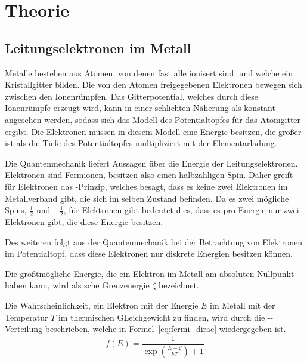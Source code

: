 
\section{Theorie}
%
\subsection{Leitungselektronen im Metall}
%
Metalle bestehen aus Atomen, von denen fast alle ionisert sind, und 
welche ein Kristallgitter bilden. Die von den Atomen freigegebenen 
Elektronen bewegen sich zwischen den Ionenrümpfen.
Das Gitterpotential, welches durch diese Ionenrümpfe erzeugt wird, kann
in einer schlichten Näherung als konstant angesehen werden, sodass sich
das Modell des Potentialtopfes für das Atomgitter ergibt. Die
Elektronen müssen in diesem Modell eine Energie besitzen, die größer ist als die
Tiefe des Potentialtopfes multipliziert mit der Elementarladung.

Die Quantenmechanik liefert Aussagen über die Energie der
Leitungselektronen.
Elektronen sind Fermionen, besitzen also einen halbzahligen Spin. Daher
greift für Elektronen das -Prinzip, welches besagt, dass es
keine zwei Elektronen im Metallverband gibt, die sich im selben Zustand
befinden. Da es zwei mögliche Spins, $\frac{1}{2}$ und $-\frac{1}{2}$,
für Elektronen gibt bedeutet dies, dass es pro Energie nur zwei
Elektronen gibt, die diese Energie besitzen.

Des weiteren folgt aus der Quantenmechanik bei der Betrachtung von
Elektronen im Potentialtopf, dass diese Elektronen nur diskrete
Energien besitzen können.

Die größtmögliche Energie, die ein Elektron im Metall am absoluten
Nullpunkt haben kann, wird als sche Grenzenergie $\zeta$
bezeichnet.

Die Wahrscheinlichkeit, ein Elektron mit der Energie $E$ im Metall mit
der Temperatur $T$ im thermischen GLeichgewicht zu finden, wird durch
die --Verteilung beschrieben, welche in
Formel~\eqref{eq:fermi_dirac} wiedergegeben ist.
\begin{equation}
f(E) = \frac{1}{\exp{\left(\frac{E - \zeta}{kT}\right)}+1}
\label{eq:fermi_dirac}
\end{equation}
%
